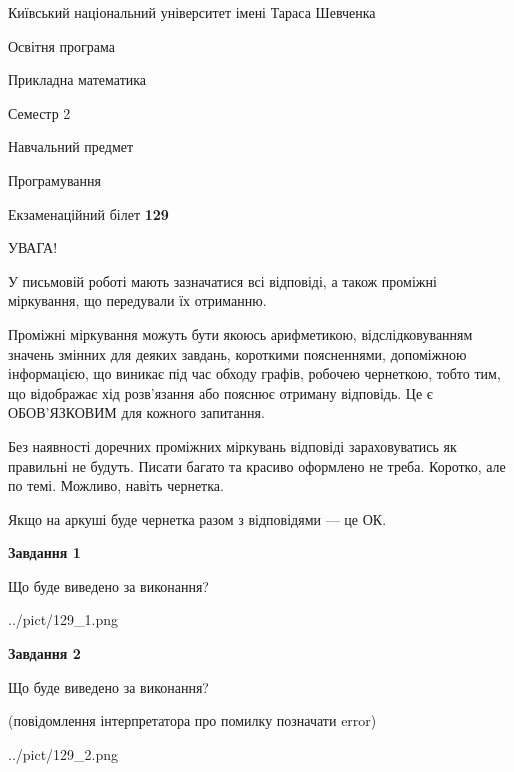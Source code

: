 \documentclass[12pt, ukrainian]{article}
\begin{document}
{{\begin {small}\par
{ \center  Київський національний університет імені Тараса Шевченка \par}
{\parbox {5 cm}{Освітня програма \hfill}{\parbox {7 cm}{Прикладна математика\hfill}}\parbox {6 cm}{\hfill Семестр 2}}\par
{\parbox {5 cm} {Навчальний предмет \hfill}\parbox {7 cm}{Програмування \hfill}\parbox {6cm}{\hfill}\par}\vspace{-7pt} \end{small}}{\center Екзаменаційний білет \No \textbf
{ 129 }\par}}
{
\begin {large}
УВАГА!

У письмовій роботі мають зазначатися всі відповіді, а також проміжні міркування, що передували їх отриманню.

Проміжні міркування можуть бути якоюсь арифметикою, відслідковуванням зна\-чень змінних для деяких завдань,
короткими поясненнями, допоміжною інформацією, що виникає під час обходу графів, робочею чернеткою,
тобто тим, що відображає хід розв’язання або пояснює отриману відповідь.
Це є ОБОВ’ЯЗКОВИМ для кожного запитання.

Без наявності доречних проміжних міркувань відповіді зараховуватись як правиль\-ні не будуть.
Писати багато та красиво оформлено не треба. Коротко, але по темі. Можли\-во, навіть чернетка.

Якщо на аркуші буде чернетка разом з відповідями --- це ОК.

\newpage

{\begin {center}\textbf{Завдання 1}\end {center}}\par
Що буде виведено за виконання?\par
\begin{center}
	{../pict/129_1.png}
\end{center}
\newpage

{\begin {center}\textbf{Завдання 2}\end {center}}\par
Що буде виведено за виконання?\par
 (повідомлення інтерпретатора про помилку позначати error)\par
\begin{center}
	{../pict/129_2.png}
\end{center}
\newpage


\end{large}}
\end{document}
